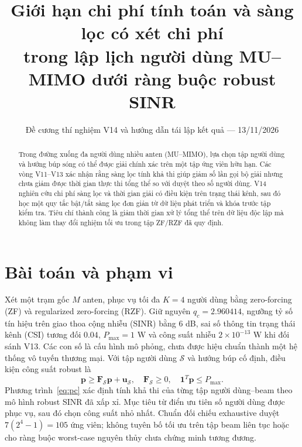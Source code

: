 \documentclass[11pt,onecolumn]{IEEEtran}
\title{Giới hạn chi phí tính toán và sàng lọc có xét chi phí\\trong lập lịch người dùng MU--MIMO dưới ràng buộc robust SINR}
\author{Đề cương thí nghiệm V14 và hướng dẫn tái lập kết quả --- 13/11/2026}
\date{}
\begin{document}
\maketitle
\begin{abstract}
Trong đường xuống đa người dùng nhiều anten (MU--MIMO), lựa chọn tập người dùng và hướng búp sóng có thể được giải chính xác trên một tập ứng viên hữu hạn. Các vòng V11--V13 xác nhận rằng sàng lọc tính khả thi giúp giảm số lần gọi bộ giải nhưng chưa giảm được thời gian thực thi tổng thể so với duyệt theo số người dùng. V14 nghiên cứu chi phí sàng lọc và thời gian giải có điều kiện trên trạng thái kênh, sau đó học một quy tắc bật/tắt sàng lọc đơn giản từ dữ liệu phát triển và khóa trước tập kiểm tra. Tiêu chí thành công là giảm thời gian xử lý tổng thể trên dữ liệu độc lập mà không làm thay đổi nghiệm tối ưu trong tập ZF/RZF đã quy định.
\end{abstract}
\section{Bài toán và phạm vi}
Xét một trạm gốc $M$ anten, phục vụ tối đa $K=4$ người dùng bằng zero-forcing (ZF) và regularized zero-forcing (RZF). Giữ nguyên $q_c=2.960414$, ngưỡng tỷ số tín hiệu trên giao thoa cộng nhiễu (SINR) bằng $6$ dB, sai số thông tin trạng thái kênh (CSI) tương đối $0.04$, $P_{\max}=1$ W và công suất nhiễu $2\times10^{-13}$ W khi đối sánh V13. Các con số là cấu hình mô phỏng, chưa được hiệu chuẩn thành một hệ thống vô tuyến thương mại. Với tập người dùng $\mathcal S$ và hướng búp cố định, điều kiện công suất robust là
\begin{equation}
\mathbf p\geq\mathbf F_{\mathcal S}\mathbf p+\mathbf u_{\mathcal S},\quad \mathbf F_{\mathcal S}\geq0,\quad \mathbf1^T\mathbf p\leq P_{\max}.
\label{eq:pc}
\end{equation}
Phương trình~\eqref{eq:pc} xác định tính khả thi của từng tập người dùng--beam theo mô hình robust SINR đã xấp xỉ. Mục tiêu từ điển ưu tiên số người dùng được phục vụ, sau đó chọn công suất nhỏ nhất. Chuẩn đối chiếu exhaustive duyệt $7(2^4-1)=105$ ứng viên; không tuyên bố tối ưu trên tập beam liên tục hoặc cho ràng buộc worst-case nguyên thủy chưa chứng minh tương đương.
\end{document}

